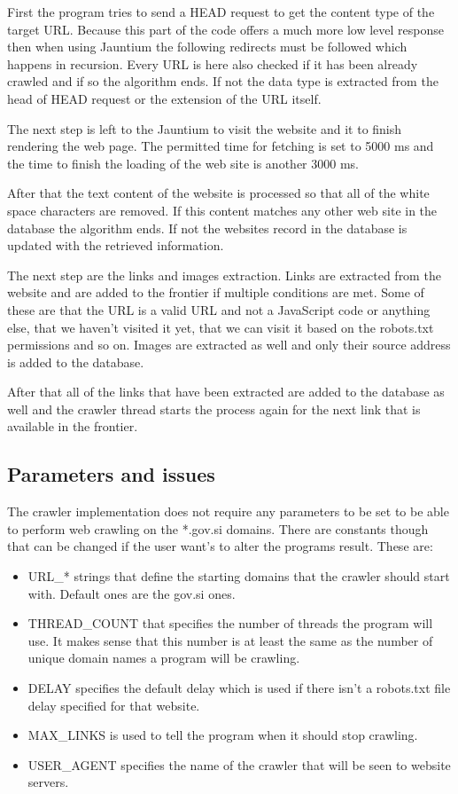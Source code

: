 \documentclass[9pt]{IEEEtran}
\begin{document}
First the program tries to send a HEAD request to get the content type of the target URL.
Because this part of the code offers a much more low level response then when using Jauntium the following redirects must be followed which happens in recursion.
Every URL is here also checked if it has been already crawled and if so the algorithm ends.
If not the data type is extracted from the head of HEAD request or the extension of the URL itself.

The next step is left to the Jauntium to visit the website and it to finish rendering the web page.
The permitted time for fetching is set to 5000 ms and the time to finish the loading of the web site is another 3000 ms. 

After that the text content of the website is processed so that all of the white space characters are removed. 
If this content matches any other web site in the database the algorithm ends.
If not the websites record in the database is updated with the retrieved information.

The next step are the links and images extraction.
Links are extracted from the website and are added to the frontier if multiple conditions are met.
Some of these are that the URL is a valid URL and not a JavaScript code or anything else, that we haven't visited it yet, that we can visit it based on the robots.txt permissions and so on.
Images are extracted as well and only their source address is added to the database.

After that all of the links that have been extracted are added to the database as well and the crawler thread starts the process again for the next link that is available in the frontier.

\subsection{Parameters and issues}

The crawler implementation does not require any parameters to be set to be able to perform web crawling on the *.gov.si domains.
There are constants though that can be changed if the user want's to alter the programs result.
These are:
\begin{itemize}
\item{URL\_* strings that define the starting domains that the crawler should start with. Default ones are the gov.si ones.}
\item{THREAD\_COUNT that specifies the number of threads the program will use. It makes sense that this number is at least the same as the number of unique domain names a program will be crawling.}
\item{DELAY specifies the default delay which is used if there isn't a robots.txt file delay specified for that website.}
\item{MAX\_LINKS is used to tell the program when it should stop crawling.}
\item{USER\_AGENT specifies the name of the crawler that will be seen to website servers.}
\end{itemize}
\end{document}
